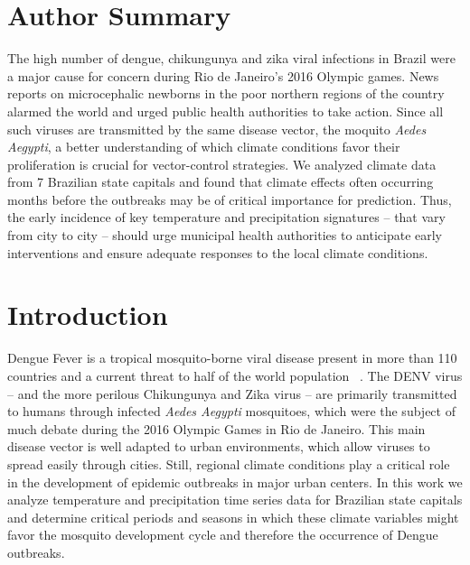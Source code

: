 \documentclass[final,leqno]{siamltexmm2}
\begin{document}
\section*{Author Summary}
The high number of dengue, chikungunya and zika viral infections in Brazil were a
major cause for concern during Rio de Janeiro's 2016 Olympic games. News reports on microcephalic
newborns in the poor northern regions of the country alarmed the world
and urged public health authorities to take action. Since all such viruses are transmitted by the same
disease vector, the moquito \emph{Aedes Aegypti}, a better understanding of which climate conditions favor their proliferation is crucial for vector-control strategies. We analyzed climate data from 7 Brazilian state capitals and found that climate effects often occurring months before the outbreaks may be of critical importance for prediction. Thus, the early incidence of key temperature and precipitation signatures -- that vary from city to city -- should urge municipal health authorities to anticipate early interventions and ensure adequate responses to the local climate conditions.
%
%

\newpage
\section*{Introduction}
Dengue Fever is a tropical mosquito-borne viral disease present in more than 110 countries
and a current threat to half of the world population ~\cite{Ranjit2011,Gubler1998,who,Bhatt}. The DENV virus -- and the more perilous Chikungunya and Zika virus -- are primarily transmitted to humans through 
infected  \emph{Aedes Aegypti} mosquitoes, which were the subject of much debate during the 2016 Olympic
Games in Rio de Janeiro. This main disease vector is well adapted to urban environments, which allow viruses to spread easily through cities.  Still, regional climate conditions play a critical role in the development of epidemic outbreaks in major urban centers. In this work we analyze temperature and precipitation time series data for Brazilian state capitals and determine critical periods and seasons in which these climate variables might favor the mosquito development cycle and therefore the occurrence of Dengue outbreaks.
\end{document}
